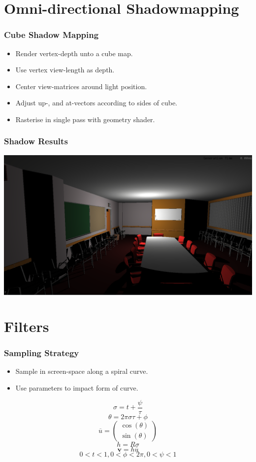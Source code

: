 \documentclass{beamer}
\begin{document}

\section{Omni-directional Shadowmapping}

\begin{frame}
\frametitle{Cube Shadow Mapping}
\begin{itemize}
\item Render vertex-depth unto a cube map.
\item Use vertex view-length as depth.
\item Center view-matrices around light position.
\item Adjust up-, and at-vectors according to sides of cube.
\item Rasterise in single pass with geometry shader.
\end{itemize}
\end{frame}

\begin{frame}
\frametitle{Shadow Results}
\begin{center}
\includegraphics[scale=0.3]{shadow}
\end{center}
\end{frame}


\section{Filters}

\begin{frame}
\frametitle{Sampling Strategy}
\begin{itemize}
\item Sample in screen-space along a spiral curve.
\item Use parameters to impact form of curve.
\end{itemize}
$$\sigma = t + \frac{\psi}{\tau} $$
$$\theta = 2\pi\sigma\tau + \phi $$
$$\overline{u} = \begin{pmatrix}\cos(\theta) \\ \sin(\theta) \end{pmatrix} $$
$$h = R \sigma $$
$$\mathbf{v} = h \overline{u}$$
$$0 < t < 1, 0 < \phi < 2\pi, 0 < \psi < 1$$
\end{frame}
\end{document}
